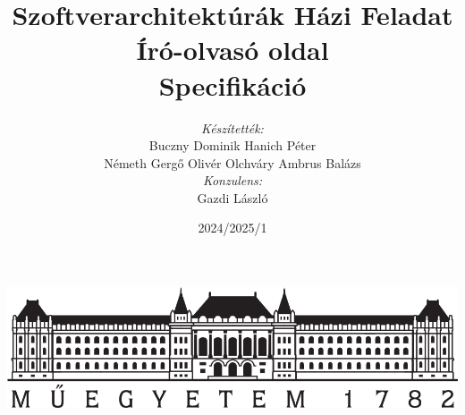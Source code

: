 \author{\textit{Készítették:}\\ Buczny Dominik \hspace{5pt} Hanich Péter \\ Németh Gergő Olivér \hspace{5pt} Olchváry Ambrus Balázs \\[10pt] \textit{Konzulens:}\\ Gazdi László}
\title{Szoftverarchitektúrák Házi Feladat \\ Író-olvasó oldal \\ \textbf{Specifikáció}}
\date{2024/2025/1}
\maketitle
\thispagestyle{empty}
\begin{center}
    \includegraphics[width=\textwidth,height=\textheight,keepaspectratio]{./figures/logo.png}
\end{center}